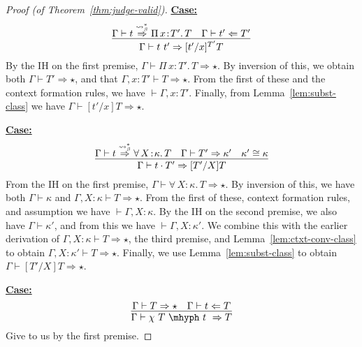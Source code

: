 \documentclass{article}
\newcommand{\abs}[4]{{#1}\, #2\! : \! #3.\, #4}
\newcommand{\tpcheck}[0]{\Leftarrow}
\newcommand{\tpsynth}[0]{\Rightarrow}
\newcommand{\tpsynthleads}[0]{\ensuremath{\overset{\leadsto_\beta^*}{\Rightarrow}}}
\newcommand{\startcase}[1]{\vspace{#1} \noindent\textbf{\underline{Case:}}}
\begin{document}
\begin{proof}[Proof (of Theorem~\ref{thm:judge-valid})]
  \startcase{.2cm}
  \[
    \infer{\Gamma\vdash t\ t' \tpsynth [t'/x]^{T'}T}{\Gamma\vdash t \tpsynthleads \abs{\Pi}{x}{T'}{T} & \Gamma\vdash t' \tpcheck T'}
  \]
  By the IH on the first premise, \(\Gamma \vdash \abs{\Pi}{x}{T'}{T} \tpsynth
  \star\).
  By inversion of this, we obtain both \(\Gamma \vdash T' \tpsynth \star\), and
  that \(\Gamma,x:T' \vdash T \tpsynth \star\).
  From the first of these and the context formation rules, we have \(\vdash
  \Gamma,x:T'\).
  Finally, from Lemma~\ref{lem:subst-class} we have \(\Gamma \vdash [t'/x]T
  \tpsynth \star\).

  \startcase{.2cm}
  \[
    \infer{
      \Gamma\vdash t \cdot T' \tpsynth [T'/X]T
    }{
      \Gamma\vdash t \tpsynthleads \abs{\forall}{X}{\kappa}{T} & \Gamma\vdash T'
      \tpsynth \kappa' & \kappa'\cong\kappa
    }
  \]
  From the IH on the first premise, \(\Gamma \vdash \abs{\forall}{X}{\kappa}{T}
  \tpsynth \star\).
  By inversion of this, we have both \(\Gamma \vdash \kappa\) and
  \(\Gamma,X:\kappa \vdash T \tpsynth \star\).
  From the first of these, context formation rules, and assumption we have
  \(\vdash \Gamma,X:\kappa\).
  By the IH on the second premise, we also have \(\Gamma \vdash \kappa'\), and
  from this we have \(\vdash \Gamma,X:\kappa'\).
  We combine this with the earlier derivation of \(\Gamma,X:\kappa \vdash T
  \tpsynth \star\), the third premise, and Lemma~\ref{lem:ctxt-conv-class} to
  obtain \(\Gamma,X:\kappa' \vdash T \tpsynth \star\).
  Finally, we use Lemma~\ref{lem:subst-class} to obtain \(\Gamma \vdash [T'/X]T
  \tpsynth \star\).
  



  \startcase{.2cm}
  \[
    \infer{\Gamma \vdash \chi\ T\ \mhyph\ t\ \tpsynth T}
    {\Gamma \vdash T \tpsynth \star & \Gamma \vdash t \tpcheck T}
  \]
  Give to us by the first premise.
\end{proof}
\end{document}
